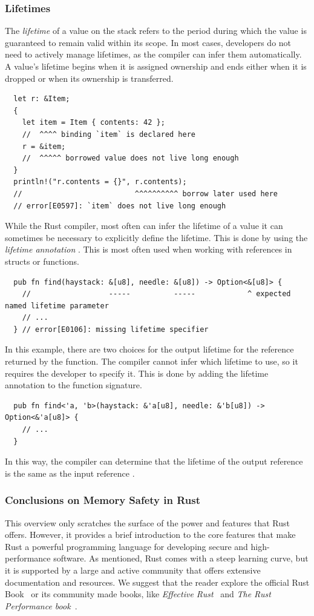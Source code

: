 \documentclass[twoside,11pt]{report}
\theoremstyle{definition}
\theoremstyle{plain}
\begin{document}
\subsubsection{Lifetimes}
The \textit{lifetime} of a value on the stack refers to the period during which the value is guaranteed to remain valid within its scope. In most cases, developers do not need to actively manage lifetimes, as the compiler can infer them automatically. A value's lifetime begins when it is assigned ownership and ends either when it is dropped or when its ownership is transferred.
\begin{verbatim}
  let r: &Item;
  {
    let item = Item { contents: 42 };
    //  ^^^^ binding `item` is declared here
    r = &item;
    //  ^^^^^ borrowed value does not live long enough
  }
  println!("r.contents = {}", r.contents);
  //                          ^^^^^^^^^^ borrow later used here
  // error[E0597]: `item` does not live long enough
\end{verbatim}
While the Rust compiler, most often can infer the lifetime of a value it can sometimes be necessary to explicitly define the lifetime. This is done by using the \textit{lifetime annotation} . This is most often used when working with references in structs or functions.
\begin{verbatim}
  pub fn find(haystack: &[u8], needle: &[u8]) -> Option<&[u8]> {
    //                  -----          -----            ^ expected named lifetime parameter
    // ...
  } // error[E0106]: missing lifetime specifier
\end{verbatim}
In this example, there are two choices for the output lifetime for the reference returned by the function. The compiler cannot infer which lifetime to use, so it requires the developer to specify it. This is done by adding the lifetime annotation to the function signature.
\begin{verbatim}
  pub fn find<'a, 'b>(haystack: &'a[u8], needle: &'b[u8]) -> Option<&'a[u8]> {
    // ...
  }
\end{verbatim}
In this way, the compiler can determine that the lifetime of the output reference is the same as the input reference .

\subsubsection{Conclusions on Memory Safety in Rust}
This overview only scratches the surface of the power and features that Rust offers. However, it provides a brief introduction to the core features that make Rust a powerful programming language for developing secure and high-performance software. As mentioned, Rust comes with a steep learning curve, but it is supported by a large and active community that offers extensive documentation and resources. We suggest that the reader explore the official Rust Book~\cite{rustlangRustProgramming} or its community made books, like \textit{Effective Rust}~\cite{lurklurkEffectiveRust} and \textit{The Rust Performance book}~\cite{rustlangPerformanceBook}.
\end{document}
